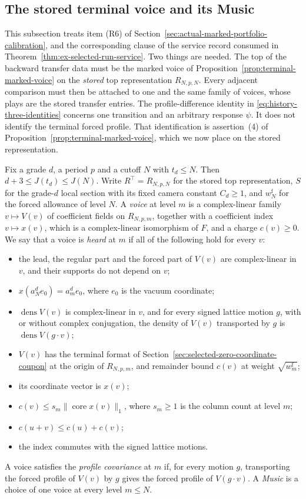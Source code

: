\subsection{The stored terminal voice and its Music}
\label{sec:selected-terminal-voice}

This subsection treats item (R6) of
Section~\ref{sec:actual-marked-portfolio-calibration}, and the
corresponding clause of the service record consumed in
Theorem~\ref{thm:ex-selected-run-service}. Two things are needed. The
top of the backward transfer data must be the marked voice of
Proposition~\ref{prop:terminal-marked-voice} on the \emph{stored} top
representation $R_{N,p,N}$. Every adjacent comparison must then be
attached to one and the same family of voices, whose plays are the
stored transfer entries. The profile-difference identity in
\eqref{eq:history-three-identities} concerns one transition and an
arbitrary response $\psi$. It does not identify the terminal forced
profile. That identification is assertion~(4) of
Proposition~\ref{prop:terminal-marked-voice}, which we now place on the
stored representation.

Fix a grade $d$, a period $p$ and a cutoff $N$ with $t_d\le N$. Then
$d+3\le J(t_d)\le J(N)$. Write $R^\top=R_{N,p,N}$ for the stored top
representation, $S$ for the grade-$d$ local section with its fixed camera
constant $C_d\ge1$, and $w^{\mathrm f}_N$ for the forced allowance of
level $N$. A \emph{voice} at level $m$ is a complex-linear family
$v\mapsto V(v)$ of coefficient fields on $R_{N,p,m}$, together with a
coefficient index $v\mapsto x(v)$, which is a complex-linear
isomorphism of $F$, and a charge $c(v)\ge0$. We say that a voice is
\emph{heard} at $m$ if all of the following hold for every $v$:
\begin{itemize}
\item the lead, the regular part and the forced part of $V(v)$ are
  complex-linear in $v$, and their supports do not depend on $v$;
\item $x(a_N^de_0)=a_m^de_0$, where $e_0$ is the vacuum coordinate;
\item $\operatorname{dens}V(v)$ is complex-linear in $v$, and for every
  signed lattice motion $g$, with or without complex conjugation, the
  density of $V(v)$ transported by $g$ is $\operatorname{dens}V(g\cdot v)$;
\item $V(v)$ has the terminal format of
  Section~\ref{sec:selected-zero-coordinate-coupon} at the origin of
  $R_{N,p,m}$, and remainder bound $c(v)$ at weight
  $\sqrt{w^{\mathrm f}_m}$;
\item its coordinate vector is $x(v)$;
\item $c(v)\le s_m\|\operatorname{core}x(v)\|_1$, where $s_m\ge1$ is the
  column count at level $m$;
\item $c(u+v)\le c(u)+c(v)$;
\item the index commutes with the signed lattice motions.
\end{itemize}
A voice satisfies the \emph{profile covariance} at $m$ if, for every
motion $g$, transporting the forced profile of $V(v)$ by $g$ gives the
forced profile of $V(g\cdot v)$. A \emph{Music} is a choice of one voice
at every level $m\le N$.

